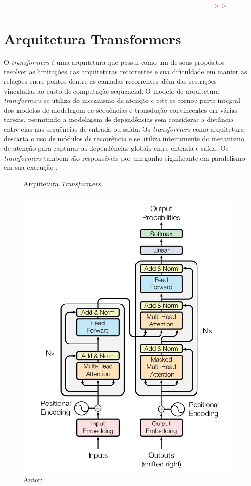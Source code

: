 \textcolor{red}{
-------------------------------------------------------------------------------------------- > >
}

\section{Arquitetura Transformers}
\label{sec:transformers}

O \textit{transformers} é uma arquitetura que possui como um de seus propósitos resolver as limitações das arquiteturas recorrentes e sua dificuldade em manter as relações entre pontos dentre as camadas recorrentes além das restrições vinculadas ao custo de computação sequencial. O modelo de arquitetura \textit{transformers} se utiliza do mecanismo de atenção e este se tornou parte integral dos modelos de modelagem de sequências e transdução convincentes em várias tarefas, permitindo a modelagem de dependências sem considerar a distância entre elas nas sequências de entrada ou saída. Os \textit{transformers} como arquitetura descarta o uso de módulos de recorrência e se utiliza inteiramente do mecanismo de atenção para capturar as dependências globais entre entrada e saída. Os \textit{transformers} também são responsáveis por um ganho significante em paralelismo em sua execução \cite{vaswaniAttentionAllYou2023}.

\begin{figure}[htbp]
    \centering
    \caption{Arquitetura \textit{Transformers}}
    \includegraphics[scale=0.6]{figures/fig004.png}
    \caption*{Autor: }
    \label{fig:fig004}
\end{figure}

